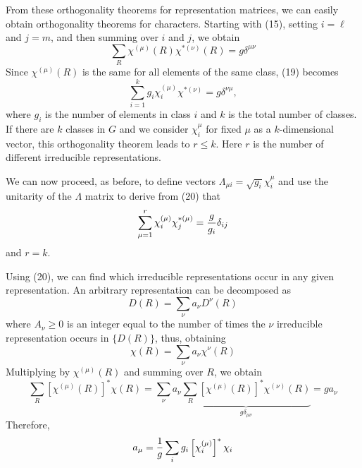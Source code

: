 From these orthogonality theorems for representation matrices, we can 
easily obtain orthogonality theorems for characters.  Starting with 
(15), setting $i = \ell$ and $j = m$, and then summing over $i$ and 
$j$, we obtain
\begin{equation}
\sum_{R} \chi^{(\mu)} (R) \chi^{*(\nu)} (R) = g 
\delta^{\mu \nu}
\label{chap16app-eqno19}
\end{equation}
Since $\chi^{(\mu)}(R)$ is the same for all elements of the same 
class, (19) becomes
\begin{equation}
\sum^{k}_{i=1} g_i \chi_i^{(\mu)} \chi^{*(\nu)} = g 
\delta^{\nu\mu},
\label{chap16app-eqno20}
\end{equation}
where $g_i$ is the number of elements in class $i$ and $k$ is the 
total number of classes.  If there are $k$ classes in $G$ and we 
consider $\chi^{\mu}_i$ for fixed $\mu$ as a $k$-dimensional vector, 
this orthogonality theorem leads to $r \leq k$.  Here $r$ is the 
number of different irreducible representations.

We can now proceed, as before, to define vectors $\Lambda_{\mu i} = 
\sqrt{g_i} \chi^{\mu}_i$ and use the unitarity of the $\Lambda$ 
matrix to derive from (20) that
\begin{equation}
\sum^{r}_{\mu=1} \chi_i^{(\mu)} \chi_j^{*(\mu)} = {g \over g_i} 
\delta_{ij}
\end{equation}
and $r = k$.

Using (20), we can find which irreducible representations occur in 
any given representation.  An arbitrary representation can be 
decomposed as
\begin{equation}
D(R) = \sum_{\nu} a_{\nu}D^{\nu}(R)
\end{equation}
where $A_{\nu} \geq 0$ is an integer equal to the number of times 
the $\nu$ irreducible representation occurs in $\{D(R)\}$, thus, 
obtaining
\begin{equation}
\chi(R) = \sum_{\nu} a_{\nu} \chi^{\nu}(R)
\end{equation}
Multiplying by $\chi^{(\mu)}(R)$ and summing over $R$, we obtain
\begin{equation}
\sum_{R} \left[ \chi^{(\mu)}(R) \right]^* \chi(R) = \sum_{\nu} 
a_{\nu} \underbrace{\sum_{R} \left[ \chi^{(\mu)}(R) \right]^* 
\chi^{(\nu)}(R)}_{g\delta_{\mu\nu}} = ga_{\nu}
\end{equation}
Therefore,
\begin{equation}
a_{\mu} = {1 \over g} \sum_{i} g_i \left[ \chi_i^{(\mu)} \right]^* 
\chi_i
\label{chap16app-eqno21}
\end{equation}

